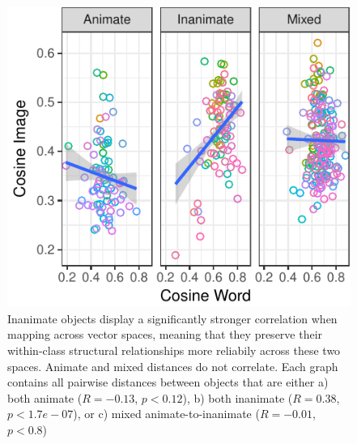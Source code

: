 \documentclass[10pt, letterpaper]{article}
\newenvironment{CodeChunk}{}{}
\begin{document}
\begin{CodeChunk}
\begin{figure}[tb]
\includegraphics{figs/pairwise-corr-animate-vs-not-1} \caption[Inanimate objects display a significantly stronger correlation when mapping across vector spaces, meaning that they preserve their within-class structural relationships more reliabily across these two spaces]{Inanimate objects display a significantly stronger correlation when mapping across vector spaces, meaning that they preserve their within-class structural relationships more reliabily across these two spaces. Animate and mixed distances do not correlate. Each graph contains all pairwise distances between objects that are either a) both animate ($R = -0.13$, $p < 0.12$), b) both inanimate ($R = 0.38$, $p < 1.7e-07$), or c) mixed animate-to-inanimate ($R = -0.01$, $p < 0.8$)}\label{fig:pairwise-corr-animate-vs-not}
\end{figure}
\end{CodeChunk}
\end{document}
